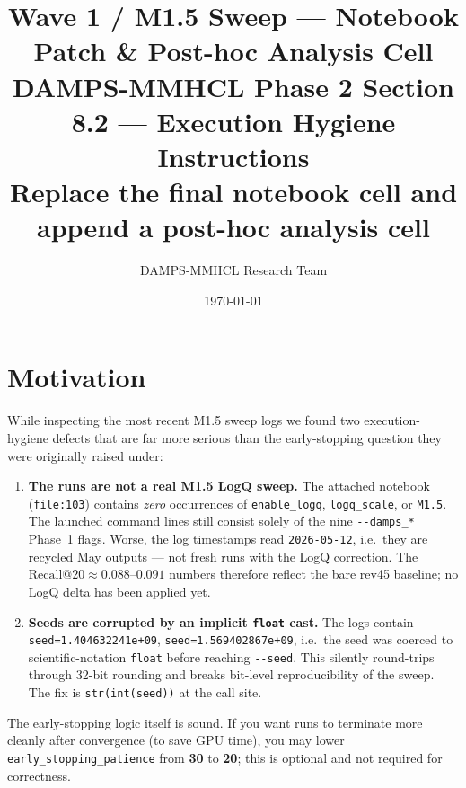 \documentclass[11pt, a4paper]{article}
\title{%
  \textbf{Wave 1 / M1.5 Sweep --- Notebook Patch \& Post-hoc Analysis Cell}\\[0.4em]
  \large DAMPS-MMHCL Phase 2 Section 8.2 --- Execution Hygiene Instructions\\[0.2em]
  \normalsize Replace the final notebook cell and append a post-hoc analysis cell
}
\author{DAMPS-MMHCL Research Team}
\date{\today}
\begin{document}
\maketitle
\tableofcontents
\newpage

\section{Motivation}
While inspecting the most recent M1.5 sweep logs we found two execution-hygiene
defects that are far more serious than the early-stopping question they were
originally raised under:

\begin{enumerate}[leftmargin=*,itemsep=4pt]
  \item \textbf{The runs are not a real M1.5 LogQ sweep.}
        The attached notebook (\texttt{file:103}) contains \emph{zero}
        occurrences of \texttt{enable\_logq}, \texttt{logq\_scale}, or
        \texttt{M1.5}. The launched command lines still consist solely of the
        nine \texttt{-{}-damps\_*} Phase~1 flags. Worse, the log timestamps read
        \texttt{2026-05-12}, i.e.\ they are recycled May outputs --- not fresh
        runs with the LogQ correction. The
        $\text{Recall@}20 \approx 0.088\text{--}0.091$ numbers therefore reflect
        the bare rev45 baseline; no LogQ delta has been applied yet.
  \item \textbf{Seeds are corrupted by an implicit \texttt{float} cast.}
        The logs contain \texttt{seed=1.404632241e+09}, \texttt{seed=1.569402867e+09},
        i.e.\ the seed was coerced to scientific-notation \texttt{float} before
        reaching \texttt{-{}-seed}. This silently round-trips through 32-bit
        rounding and breaks bit-level reproducibility of the sweep. The fix is
        \texttt{str(int(seed))} at the call site.
\end{enumerate}

The early-stopping logic itself is sound. If you want runs to terminate more
cleanly after convergence (to save GPU time), you may lower
\texttt{early\_stopping\_patience} from \textbf{30} to \textbf{20}; this is
optional and not required for correctness.

\end{document}
